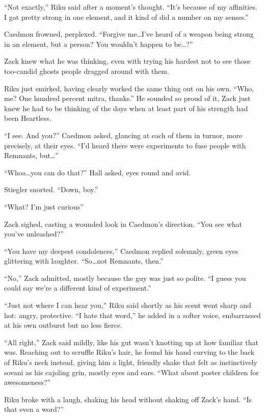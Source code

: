 ``Not exactly,'' Riku said after a moment's thought. ``It's because of my affinities. I got pretty strong in one element, and it kind of did a number on my senses.''

Caedmon frowned, perplexed. ``Forgive me\ldots I've heard of a weapon being strong in an element, but a person? You wouldn't happen to be\ldots ?''

Zack knew what he was thinking, even with trying his hardest not to see those too-candid ghosts people dragged around with them.

Riku just smirked, having clearly worked the same thing out on his own. ``Who, me? One hundred percent mitra, thanks.'' He sounded so proud of it, Zack just knew he had to be thinking of the days when at least part of his strength had been Heartless.

``I see. And you?'' Caedmon asked, glancing at each of them in turn\textemdash or, more precisely, at their eyes. ``I'd heard there were experiments to fuse people with Remnants, but\ldots''

``Whoa\ldots you can do that?'' Hall asked, eyes round and avid.

Stiegler snorted. ``Down, boy.''

``What? I'm just curious\textemdash''

Zack sighed, casting a wounded look in Caedmon's direction. ``You see what you've unleashed?''

``You have my deepest condolences,'' Caedmon replied solemnly, green eyes glittering with laughter. ``So\ldots not Remnants, then.''

``No,'' Zack admitted, mostly because the guy was just so polite. ``I guess you could say we're a different kind of experiment.''

``Just not where I can hear you,'' Riku said shortly as his scent went sharp and hot: angry, protective. ``I hate that word,'' he added in a softer voice, embarrassed at his own outburst but no less fierce.

``All right,'' Zack said mildly, like his gut wasn't knotting up at how familiar that was. Reaching out to scruffle Riku's hair, he found his hand curving to the back of Riku's neck instead, giving him a light, friendly shake that felt as instinctively sovani as his cajoling grin, mostly eyes and ears. ``What about poster children for awesomeness?''

Riku broke with a laugh, shaking his head without shaking off Zack's hand. ``Is that even a word?''

